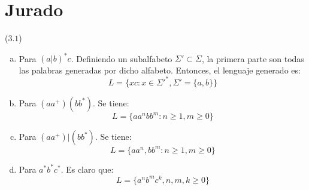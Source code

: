 \section*{Jurado}








\begin{mdframed}[style = warning]
	\begin{problem}
		($3.1$) 	
		\begin{enumerate}[a)]
			\item Para $(a|b)^*c$. Definiendo un subalfabeto $\Sigma ' \subset \Sigma$, la primera parte son todas las palabras generadas por dicho alfabeto. Entonces, el lenguaje generado es:
				$$L = \{ xc: x\in \Sigma '^*, \Sigma ' = \{ a,b \} \}$$
			\item Para $(aa^+)(bb^*)$. Se tiene:
				$$L = \{ aa^nbb^m: n\geq 1, m\geq 0 \}$$
			\item Para $(aa^+)|(bb^*)$. Se tiene:
				$$L = \{ aa^n,bb^m: n\geq 1, m\geq 0 \}$$
			\item Para $a^* b^* c^*$. Es claro que:
				$$L = \{ a^nb^mc^k, n,m,k \geq 0 \}$$
		\end{enumerate}
	\end{problem}
\end{mdframed}


















